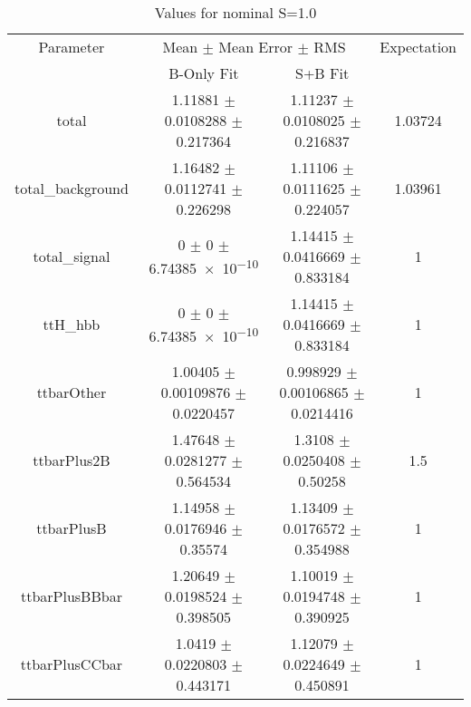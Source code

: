 \begin{table}
\centering
\caption{Values for nominal S=1.0}
\begin{tabular}{cccc}
\toprule
Parameter & \multicolumn{2}{c}{Mean $\pm$ Mean Error $\pm$ RMS} & Expectation\\
 & B-Only Fit & S+B Fit & \\
\midrule
total & \num{1.11881} $\pm$ \num{0.0108288} $\pm$ \num{0.217364} & \num{1.11237} $\pm$ \num{0.0108025} $\pm$ \num{0.216837} & \num{1.03724}\\
total\_background & \num{1.16482} $\pm$ \num{0.0112741} $\pm$ \num{0.226298} & \num{1.11106} $\pm$ \num{0.0111625} $\pm$ \num{0.224057} & \num{1.03961}\\
total\_signal & \num{0} $\pm$ \num{0} $\pm$ \num{6.74385e-10} & \num{1.14415} $\pm$ \num{0.0416669} $\pm$ \num{0.833184} & \num{1}\\
ttH\_hbb & \num{0} $\pm$ \num{0} $\pm$ \num{6.74385e-10} & \num{1.14415} $\pm$ \num{0.0416669} $\pm$ \num{0.833184} & \num{1}\\
ttbarOther & \num{1.00405} $\pm$ \num{0.00109876} $\pm$ \num{0.0220457} & \num{0.998929} $\pm$ \num{0.00106865} $\pm$ \num{0.0214416} & \num{1}\\
ttbarPlus2B & \num{1.47648} $\pm$ \num{0.0281277} $\pm$ \num{0.564534} & \num{1.3108} $\pm$ \num{0.0250408} $\pm$ \num{0.50258} & \num{1.5}\\
ttbarPlusB & \num{1.14958} $\pm$ \num{0.0176946} $\pm$ \num{0.35574} & \num{1.13409} $\pm$ \num{0.0176572} $\pm$ \num{0.354988} & \num{1}\\
ttbarPlusBBbar & \num{1.20649} $\pm$ \num{0.0198524} $\pm$ \num{0.398505} & \num{1.10019} $\pm$ \num{0.0194748} $\pm$ \num{0.390925} & \num{1}\\
ttbarPlusCCbar & \num{1.0419} $\pm$ \num{0.0220803} $\pm$ \num{0.443171} & \num{1.12079} $\pm$ \num{0.0224649} $\pm$ \num{0.450891} & \num{1}\\
\bottomrule
\end{tabular}
\end{table}